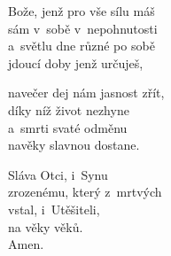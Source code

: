 \begin{translatioMulticol}{3}
Bože, jenž pro vše sílu máš\\
sám v~sobě v~nepohnutosti\\
a~světlu dne různé po sobě\\
jdoucí doby jenž určuješ,\columnbreak

navečer dej nám jasnost zřít,\\
díky níž život nezhyne\\
a~smrti svaté odměnu\\
navěky slavnou dostane.\columnbreak

Sláva Otci, i~Synu\\
zrozenému, který z~mrtvých\\
vstal, i~Utěšiteli,\\
na věky věků.\\
Amen.
\end{translatioMulticol}
